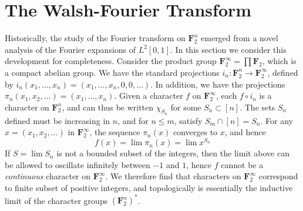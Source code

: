 \section{The Walsh-Fourier Transform}

Historically, the study of the Fourier transform on $\mathbf{F}_2^n$ emerged from a novel analysis of the Fourier expansions of $L^2[0,1]$. In this section we consider this development for completeness. Consider the product group $\mathbf{F}_2^\infty = \prod \mathbf{F}_2$, which is a compact abelian group. We have the standard projections $i_n: \mathbf{F}_2^n \to \mathbf{F}_2^\infty$, defined by $i_n(x_1, \dots, x_n) = (x_1, \dots, x_n, 0, 0, \dots)$. In addition, we have the projections $\pi_n(x_1, x_2, \dots) = (x_1, \dots, x_n)$. Given a character $f$ on $\mathbf{F}_2^\infty$, each $f \circ i_n$ is a character on $\mathbf{F}_2^n$, and can thus be written $\chi_{S_n}$ for some $S_n \subset [n]$. The sets $S_n$ defined must be increasing in $n$, and for $n \leq m$, satisfy $S_m \cap [n] = S_n$. For any $x = (x_1, x_2, \dots)$ in $\mathbf{F}_2^\infty$, the sequence $\pi_n(x)$ converges to $x$, and hence
%
\[ f(x) = \lim \pi_n(x) = \lim x^{S_n} \]
%
If $S = \lim S_n$ is not a bounded subset of the integers, then the limit above can be allowed to oscillate infinitely between $-1$ and $1$, hence $f$ cannot be a {\it continuous} character on $\mathbf{F}_2^\infty$. We therefore find that characters on $\mathbf{F}_2^\infty$ correspond to finite subset of positive integers, and topologically is essentially the inductive limit of the character groups $(\mathbf{F}_2^n)^*$.

